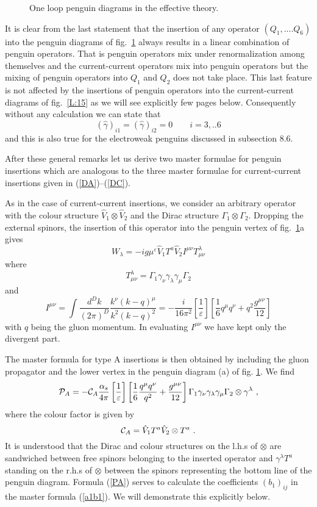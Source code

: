 \documentclass[12pt,rotate]{article}
\def\as{\alpha_s}
\newcommand{\be}{\begin{equation}}
\newcommand{\ee}{\end{equation}}
\begin{document}
\begin{itemize}
\begin{itemize}
\begin{figure}[hbt]
{}%
\vspace{0.08in}
\caption[]{One loop penguin diagrams in the effective theory.
\label{L:16}}
\end{figure}
It is clear from the last statement that the insertion of any
operator $(Q_1,....Q_6)$ into the penguin diagrams of fig.~\ref{L:16}
always results in a linear combination of penguin operators.
That is penguin operators  mix under renormalization among
themselves and the current-current operators  mix into
penguin operators but the mixing of penguin operators into
$Q_1$ and $Q_2$ does not take place. This last feature is
not affected by the insertions of penguin operators into
the current-current diagrams of fig.~\ref{L:15} as we will see
explicitly few pages below. Consequently without any calculation
we can state that
\be
(\hat\gamma)_{i1}=(\hat\gamma)_{i2}=0\quad\quad i=3,..6
\ee
and this is also true for the electroweak penguins discussed
in subsection 8.6. 

After these general remarks let us derive two master formulae
for penguin insertions which are analogous to the three master
formulae for current-current insertions given in 
(\ref{DA})--(\ref{DC}).

As in the case of current-current insertions, we consider an 
arbitrary operator with the colour structure $\hat V_1\otimes \hat V_2$
and the Dirac structure $\Gamma_1\otimes\Gamma_2$. Dropping the external
spinors, the insertion of this operator into the penguin vertex of
fig.~\ref{L:16}a  gives
\be\label{WL}
W_\lambda=-i g \mu^\varepsilon \hat V_1 T^a \hat V_2 I^{\mu\nu}
T^\lambda_{\mu\nu}
\ee
where
\be
T^\lambda_{\mu\nu}=\Gamma_1 \gamma_\nu \gamma_\lambda\gamma_\mu \Gamma_2
\ee
and
\be
I^{\mu\nu}=\int\frac{d^Dk}{(2\pi)^D}
\frac{k^\nu (k-q)^\mu}{k^2 (k-q)^2}=
-\frac{i}{16\pi^2} \left[\frac{1}{\varepsilon}\right]
\left[\frac{1}{6}q^\mu q^\nu+q^2\frac{g^{\mu\nu}}{12}\right]
\ee
with $q$ being the gluon momentum. In evaluating $I^{\mu\nu}$
we have kept only the divergent part.

The master formula for type A insertions is then obtained by including
the gluon propagator and the lower vertex in the penguin diagram (a)
of fig. \ref{L:16}. We find
\be\label{PA}
{\cal P}_A= -{\cal C}_A \frac{\as}{4\pi} 
\left[\frac{1}{\varepsilon}\right]
\left[\frac{1}{6}\frac{q^\mu q^\nu}{q^2}+\frac{g^{\mu\nu}}{12}\right]
\Gamma_1\gamma_\nu\gamma_\lambda\gamma_\mu\Gamma_2\otimes \gamma^\lambda~,
\ee
where the colour factor is given by
\be\label{PAC}
{\cal C}_A=\hat V_1 T^a\hat V_2\otimes T^a~.
\ee
It is understood that the Dirac and colour structures on the l.h.s of 
$\otimes$ are sandwiched between free spinors belonging to the
inserted operator and $\gamma^\lambda T^a$ standing on the r.h.s of 
$\otimes$ between the spinors representing the bottom line of the
penguin diagram. Formula (\ref{PA}) serves to calculate the
coefficients $(b_1)_{ij}$ in the master formula (\ref{a1b1}). We will
demonstrate this explicitly below.


\end{itemize}
\end{itemize}
\end{document}
